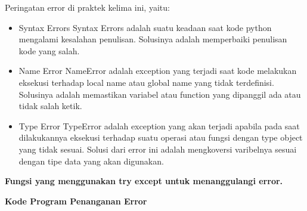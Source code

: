 Peringatan error di praktek kelima ini, yaitu:
\begin{itemize}
	\item Syntax Errors
	Syntax Errors adalah suatu keadaan saat kode python mengalami kesalahan penulisan. Solusinya adalah memperbaiki penulisan kode yang salah.

	\item Name Error
	NameError adalah exception yang terjadi saat kode melakukan eksekusi terhadap local name atau global name yang tidak terdefinisi. Solusinya adalah memastikan variabel atau function yang dipanggil ada atau tidak salah ketik.

	\item Type Error
	TypeError adalah exception yang akan terjadi apabila pada saat dilakukannya eksekusi terhadap suatu operasi atau fungsi dengan type object yang tidak sesuai. Solusi dari error ini adalah mengkoversi varibelnya sesuai dengan tipe data yang akan digunakan.
\end{itemize}

\textbf{Fungsi yang menggunakan try except untuk menanggulangi error.}



\textbf{Kode Program Penanganan Error}

